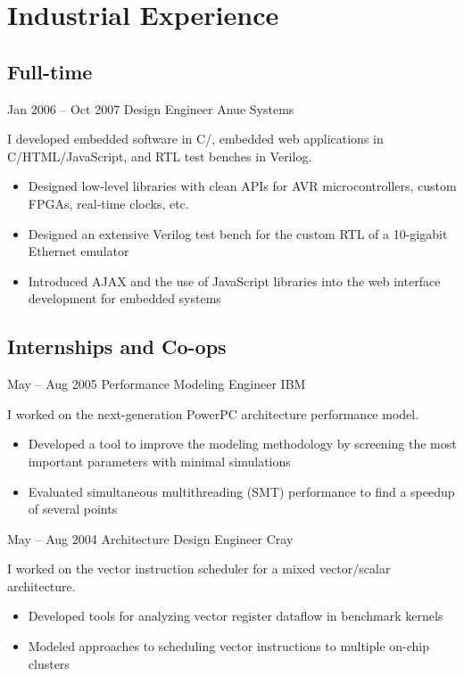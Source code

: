 \documentclass[11pt,a4paper,roman]{moderncv}
\begin{document}
\section{Industrial Experience}


\subsection{Full-time}

\cventry%
{Jan 2006 -- Oct 2007}%
{Design Engineer}%
{Anue Systems}%
{\austin}%
{}%
{I developed embedded software in C/\Cpp, embedded web applications in C/HTML/JavaScript, and RTL test benches in Verilog.
\begin{itemize}
\item Designed low-level libraries with clean APIs for AVR microcontrollers, custom FPGAs, real-time clocks, etc.
\item Designed an extensive Verilog test bench for the custom RTL of a 10-gigabit Ethernet emulator
\item Introduced AJAX and the use of JavaScript libraries into the web interface development for embedded systems
\end{itemize}}


\subsection{Internships and Co-ops}

\cventry%
{May -- Aug 2005}%
{Performance Modeling Engineer}%
{IBM}%
{\austin}%
{}%
{I worked on the next-generation PowerPC architecture performance model.
\begin{itemize}
\item Developed a tool to improve the modeling methodology by screening the most important parameters with minimal simulations
\item Evaluated simultaneous multithreading (SMT) performance to find a speedup of several points
\end{itemize}}

\cventry%
{May -- Aug 2004}%
{Architecture Design Engineer}%
{Cray}%
{\chippewafalls}%
{}%
{I worked on the vector instruction scheduler for a mixed vector/scalar architecture.
\begin{itemize}
\item Developed tools for analyzing vector register dataflow in benchmark kernels
\item Modeled approaches to scheduling vector instructions to multiple on-chip clusters
\end{itemize}}
\end{document}
